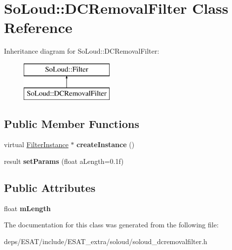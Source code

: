 \hypertarget{class_so_loud_1_1_d_c_removal_filter}{}\section{So\+Loud\+:\+:D\+C\+Removal\+Filter Class Reference}
\label{class_so_loud_1_1_d_c_removal_filter}
Inheritance diagram for So\+Loud\+:\+:D\+C\+Removal\+Filter\+:\begin{figure}[H]
\begin{center}
\leavevmode
\includegraphics[height=2.000000cm]{class_so_loud_1_1_d_c_removal_filter}
\end{center}
\end{figure}
\subsection*{Public Member Functions}
\begin{DoxyCompactItemize}
\item 
\mbox{\label{class_so_loud_1_1_d_c_removal_filter_a59917116078dd4e42cff7185f563597e}} 
virtual \mbox{\hyperlink{class_so_loud_1_1_filter_instance}{Filter\+Instance}} $\ast$ {\bfseries create\+Instance} ()
\item 
\mbox{\label{class_so_loud_1_1_d_c_removal_filter_aace2e51a78bd1457b719d67079bb1bcd}} 
result {\bfseries set\+Params} (float a\+Length=0.\+1f)
\end{DoxyCompactItemize}
\subsection*{Public Attributes}
\begin{DoxyCompactItemize}
\item 
\mbox{\label{class_so_loud_1_1_d_c_removal_filter_ac2f6517e56840935aade3cfcce7bfcec}} 
float {\bfseries m\+Length}
\end{DoxyCompactItemize}


The documentation for this class was generated from the following file\+:\begin{DoxyCompactItemize}
\item 
deps/\+E\+S\+A\+T/include/\+E\+S\+A\+T\+\_\+extra/soloud/soloud\+\_\+dcremovalfilter.\+h\end{DoxyCompactItemize}
